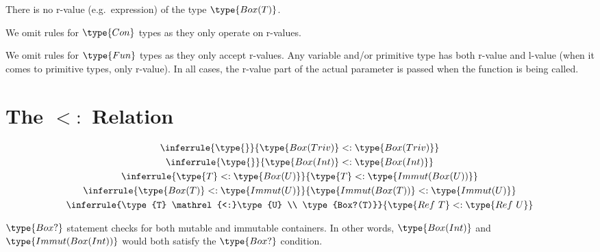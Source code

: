 \documentclass{article}
\newcommand\subtype{\mathrel{<:}}
\begin{document}
\medskip

There is no r-value (e.g.\ expression) of the type $\type{Box(T)}$.

\medskip

We omit rules for $\type{Con}$ types as they only operate on r-values.

\medskip

We omit rules for $\type{Fun}$ types as they only accept r-values.
Any variable and/or primitive type has both r-value and l-value (when it comes
to primitive types, only r-value). In all cases, the r-value part of the actual
parameter is passed when the function is being called.


\section*{The $\subtype$ Relation}

\begin{gather}
  \inferrule{\type{}}{\type{Box(Triv)} \subtype \type{Box(Triv)}}\\
  \inferrule{\type{}}{\type{Box(Int)} \subtype \type{Box(Int)}}\\
  \inferrule{\type{T} \subtype \type{Box(U)}}{\type{T} \subtype \type{Immut(Box(U))}}\\
  \inferrule{\type{Box(T)} \subtype \type{Immut(U)}}{\type{Immut(Box(T))} \subtype \type{Immut(U)}}\\
  \inferrule{\type{T} \subtype \type{U} \\ \type{Box?(T)}}{\type{Ref\ T} \subtype \type{Ref\ U}}
\end{gather}

$\type{Box?}$ statement checks for both mutable and immutable containers.
In other words, $\type{Box(Int)}$ and $\type{Immut(Box(Int))}$ would both
satisfy the $\type{Box?}$ condition.

\end{document}

